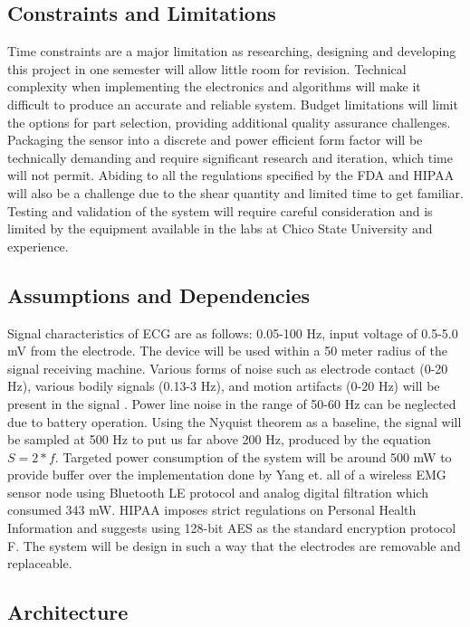 \documentclass{article}
\begin{document}
\subsection{Constraints and Limitations}
Time constraints are a major limitation as researching, designing and developing this project in one semester will allow little room for revision. Technical complexity when implementing the electronics and algorithms will make it difficult to produce an accurate and reliable system. Budget limitations will limit the options for part selection, providing additional quality assurance challenges. Packaging the sensor into a discrete and power efficient form factor will be technically demanding and require significant research and iteration, which time will not permit. Abiding to all the regulations specified by the FDA and HIPAA will also be a challenge due to the shear quantity and limited time to get familiar. Testing and validation of the system will require careful consideration and is limited by the equipment available in the labs at Chico State University and experience.

\subsection{Assumptions and Dependencies}
Signal characteristics of ECG are as follows: 0.05-100 Hz, input voltage of 0.5-5.0 mV \cite{adialogue} from the electrode. The device will be used within a 50 meter radius of the signal receiving machine. Various forms of noise such as electrode contact (0-20 Hz), various bodily signals (0.13-3 Hz), and motion artifacts (0-20 Hz) will be present in the signal \cite{ecgfiltering}. Power line noise in the range of 50-60 Hz can be neglected due to battery operation. Using the Nyquist theorem as a baseline, the signal will be sampled at 500 Hz to put us far above 200 Hz, produced by the equation $S = 2 * f$. Targeted power consumption of the system will be around 500 mW to provide buffer over the implementation done by Yang et. all \cite{yang} of a wireless EMG sensor node using Bluetooth LE protocol and analog digital filtration which consumed 343 mW. HIPAA imposes strict regulations on Personal Health Information and suggests using 128-bit AES as the standard encryption protocol F\cite{sprinto}. The system will be design in such a way that the electrodes are removable and replaceable. 

\newpage
\subsection{Architecture}
\end{document}
